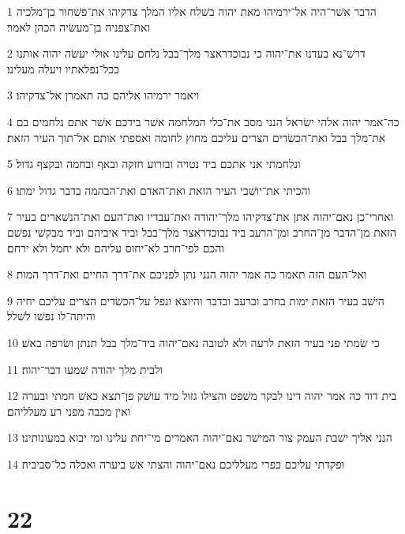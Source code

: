 \par 1 הדבר אשׁר־היה אל־ירמיהו מאת יהוה בשׁלח אליו המלך צדקיהו את־פשׁחור בן־מלכיה ואת־צפניה בן־מעשׂיה הכהן לאמר׃
\par 2 דרשׁ־נא בעדנו את־יהוה כי נבוכדראצר מלך־בבל נלחם עלינו אולי יעשׂה יהוה אותנו ככל־נפלאתיו ויעלה מעלינו׃
\par 3 ויאמר ירמיהו אליהם כה תאמרן אל־צדקיהו׃
\par 4 כה־אמר יהוה אלהי ישׂראל הנני מסב את־כלי המלחמה אשׁר בידכם אשׁר אתם נלחמים בם את־מלך בבל ואת־הכשׂדים הצרים עליכם מחוץ לחומה ואספתי אותם אל־תוך העיר הזאת׃
\par 5 ונלחמתי אני אתכם ביד נטויה ובזרוע חזקה ובאף ובחמה ובקצף גדול׃
\par 6 והכיתי את־יושׁבי העיר הזאת ואת־האדם ואת־הבהמה בדבר גדול ימתו׃
\par 7 ואחרי־כן נאם־יהוה אתן את־צדקיהו מלך־יהודה ואת־עבדיו ואת־העם ואת־הנשׁארים בעיר הזאת מן־הדבר מן־החרב ומן־הרעב ביד נבוכדראצר מלך־בבל וביד איביהם וביד מבקשׁי נפשׁם והכם לפי־חרב לא־יחוס עליהם ולא יחמל ולא ירחם׃
\par 8 ואל־העם הזה תאמר כה אמר יהוה הנני נתן לפניכם את־דרך החיים ואת־דרך המות׃
\par 9 הישׁב בעיר הזאת ימות בחרב וברעב ובדבר והיוצא ונפל על־הכשׂדים הצרים עליכם יחיה והיתה־לו נפשׁו לשׁלל׃
\par 10 כי שׂמתי פני בעיר הזאת לרעה ולא לטובה נאם־יהוה ביד־מלך בבל תנתן ושׂרפה באשׁ׃
\par 11 ולבית מלך יהודה שׁמעו דבר־יהוה׃
\par 12 בית דוד כה אמר יהוה דינו לבקר משׁפט והצילו גזול מיד עושׁק פן־תצא כאשׁ חמתי ובערה ואין מכבה מפני רע מעלליהם׃
\par 13 הנני אליך ישׁבת העמק צור המישׁר נאם־יהוה האמרים מי־יחת עלינו ומי יבוא במעונותינו׃
\par 14 ופקדתי עליכם כפרי מעלליכם נאם־יהוה והצתי אשׁ ביערה ואכלה כל־סביביה׃

\chapter{22}

